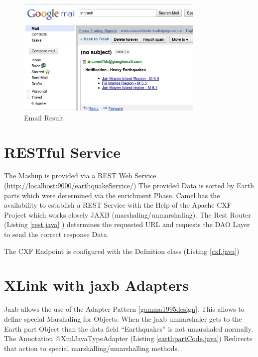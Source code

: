\documentclass[11pt,english,ngerman, headsepline]{scrreprt}
\begin{document}
 \begin{figure}[h!]
	\begin{center}
	\includegraphics[width=0.8\textwidth]{pics/EmailResult.jpg}
	\end{center}
	\caption{Email Result}
	\label{EmailResult} 
   \end{figure}

 




\chapter{RESTful Service}

The Mashup is provided via a REST Web Service
(\url{http://localhost:9000/earthquakeService/})
The provided Data is sorted by Earth parts which were determined via the
enrichment Phase.
Camel has the availability to establish a REST Service with the Help of the
Apache CXF Project which works closely JAXB (marshaling/unmarshaling). 
The Rest Router (Listing \ref{rest.java} ) determines the requested URL and
requests the DAO Layer \cite{fowler2002patterns} to send the correct response
Data.



The CXF Endpoint is configured with the Definition class (Listing
\ref{cxf.java})
   


\chapter{XLink with jaxb Adapters}
Jaxb allows the use of the Adapter Pattern \ref{gamma1995design}. This allows to
define special Marshaling for Objects.
When the jaxb unmarshaler gets to the Earth part Object than the data field
``Earthquakes'' is not umarshaled normally. 
The Annotation @XmlJavaTypeAdapter (Listing \ref{earthpartCode.java}) Redirects that
action to special marshalling/umarshalling methods. 
\end{document}
